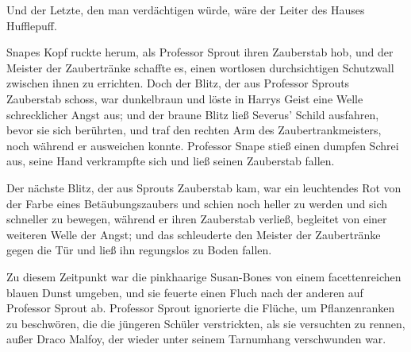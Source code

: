 Und der Letzte, den man verdächtigen würde, wäre der Leiter des Hauses Hufflepuff.

Snapes Kopf ruckte herum, als Professor Sprout ihren Zauberstab hob, und der Meister der Zaubertränke schaffte es, einen wortlosen durchsichtigen Schutzwall zwischen ihnen zu errichten. Doch der Blitz, der aus Professor Sprouts Zauberstab schoss, war dunkelbraun und löste in Harrys Geist eine Welle schrecklicher Angst aus; und der braune Blitz ließ Severus' Schild ausfahren, bevor sie sich berührten, und traf den rechten Arm des Zaubertrankmeisters, noch während er ausweichen konnte.
Professor Snape stieß einen dumpfen Schrei aus, seine Hand verkrampfte sich und ließ seinen Zauberstab fallen.

Der nächste Blitz, der aus Sprouts Zauberstab kam, war ein leuchtendes Rot von der Farbe eines Betäubungszaubers und schien noch heller zu werden und sich schneller zu bewegen, während er ihren Zauberstab verließ, begleitet von einer weiteren Welle der Angst; und das schleuderte den Meister der Zaubertränke gegen die Tür und ließ ihn regungslos zu Boden fallen.

Zu diesem Zeitpunkt war die pinkhaarige Susan-Bones von einem facettenreichen blauen Dunst umgeben, und sie feuerte einen Fluch nach der anderen auf Professor Sprout ab. Professor Sprout ignorierte die Flüche, um Pflanzenranken zu beschwören, die die jüngeren Schüler verstrickten, als sie versuchten zu rennen, außer Draco Malfoy, der wieder unter seinem Tarnumhang verschwunden war.

